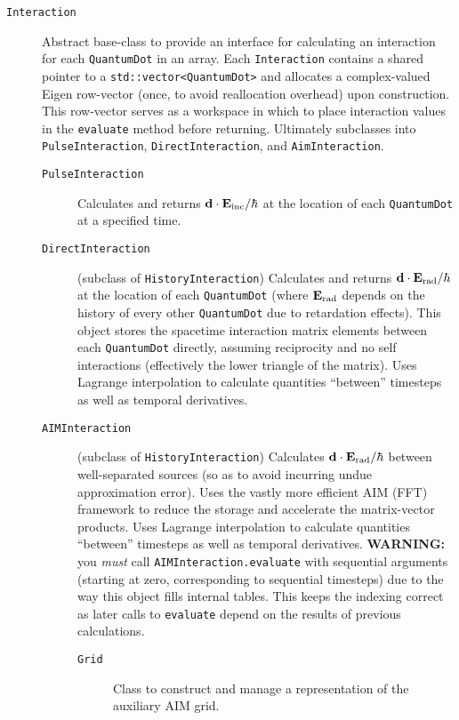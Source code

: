 \begin{description}
  \item[\texttt{Interaction}] Abstract base-class to provide an interface for calculating an interaction for each \lstinline!QuantumDot! in an array.
    Each \lstinline!Interaction! contains a shared pointer to a \lstinline!std::vector<QuantumDot>! and allocates a complex-valued Eigen row-vector (once, to avoid reallocation overhead) upon construction.
    This row-vector serves as a workspace in which to place interaction values in the \lstinline!evaluate! method before returning.
    Ultimately subclasses into \lstinline!PulseInteraction!, \lstinline!DirectInteraction!, and \lstinline!AimInteraction!.
    \begin{description}
      \item[\texttt{PulseInteraction}] Calculates and returns $\vb{d} \cdot \vb{E}_\text{inc}/\hbar$ at the location of each \lstinline!QuantumDot! at a specified time.
      \item[\texttt{DirectInteraction}] (subclass of \lstinline!HistoryInteraction!)
        Calculates and returns $\vb{d} \cdot \vb{E}_\text{rad}/\hbar$ at the location of each \lstinline!QuantumDot! (where $\vb{E}_\text{rad}$ depends on the history of every other \lstinline!QuantumDot! due to retardation effects).
        This object stores the spacetime interaction matrix elements between each \lstinline!QuantumDot! directly, assuming reciprocity and no self interactions (effectively the lower triangle of the matrix).
        Uses Lagrange interpolation to calculate quantities ``between'' timesteps as well as temporal derivatives.
      \item[\texttt{AIMInteraction}] (subclass of \lstinline!HistoryInteraction!)
        Calculates $\vb{d} \cdot \vb{E}_\text{rad}/\hbar$ between well-separated sources (so as to avoid incurring undue approximation error).
        Uses the vastly more efficient AIM (FFT) framework to reduce the storage and accelerate the matrix-vector products.
        Uses Lagrange interpolation to calculate quantities ``between'' timesteps as well as temporal derivatives.
        \textcolor{Red!90!black}{\textbf{WARNING:}} you \emph{must} call \lstinline!AIMInteraction.evaluate! with sequential arguments (starting at zero, corresponding to sequential timesteps) due to the way this object fills internal tables.
        This keeps the indexing correct as later calls to \lstinline!evaluate! depend on the results of previous calculations.
        \begin{description}
          \item[\texttt{Grid}] Class to construct and manage a representation of the auxiliary AIM grid.

\end{description}
\end{description}
\end{description}
